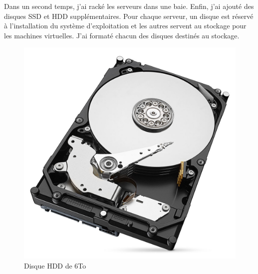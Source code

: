 \documentclass[12pt, a4paper, twoside]{article}
\begin{document}
Dans un second temps, j'ai racké les serveurs dans une baie. 
Enfin, j'ai ajouté des disques \gls{SSD} et \gls{HDD} supplémentaires.
Pour chaque serveur, un disque est réservé à l'installation du système d'exploitation et les autres servent au stockage pour les machines virtuelles.
J'ai formaté chacun des disques destinés au stockage.

\begin{figure}[!h]
    \begin{minipage}[b]{0.45\textwidth}
        \centering
        \includegraphics[width=\textwidth,height=\textheight,keepaspectratio]{src/img_hdd.jpg}
        \caption{Disque HDD de 6To}
        \label{fig:hdd_disk}
    \end{minipage}
    \hfill
    \begin{minipage}[b]{0.45\textwidth}
        \centering

\end{minipage}
\end{figure}
\end{document}
